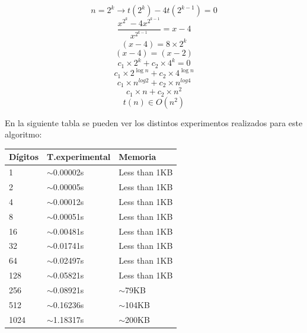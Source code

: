 \documentclass{article}
\begin{document}
$$n = 2^k \rightarrow t(2^k)-4t (2^{k-1})=0$$
$$\frac{x^{2^k}-4x^{2^{k-1}}}{x^{2^{k-1}}} = x-4 $$
$$ (x-4)=8 \times 2^k $$
$$ (x-4)=(x-2) $$
$$ c_1\times 2^k+c_2 \times 4^k=0 $$
$$ c_1 \times 2^{\log n}+c_2 \times 4^{\log n} $$
$$ c_1 \times n^{log 2}+c_2 \times n^{log 4} $$
$$ c_1 \times n+c_2 \times n^2 $$
$$ t(n)\in O(n^2) $$

\begin{center}
En la siguiente tabla se pueden ver los distintos experimentos realizados para este algoritmo: 
\end{center}
\label{dyv-table}
\begin{adjustbox}{width=0.5\textwidth,center=\textwidth}
\begin{tabular}{|l|l|l|}
\hline
{Dígitos} 					   & {T.experimental} 					   	& {Memoria} 					 \\ \hline
1                              & $\sim$0.00002s                         & Less than 1KB                  \\ \hline
2                              & $\sim$0.00005s                        	& Less than 1KB                  \\ \hline
4                              & $\sim$0.00012s                        	& Less than 1KB                  \\ \hline
8                              & $\sim$0.00051s                        	& Less than 1KB                  \\ \hline
16                             & $\sim$0.00481s                        	& Less than 1KB                  \\ \hline
32                             & $\sim$0.01741s                       	& Less than 1KB                  \\ \hline
64                             & $\sim$0.02497s                        	& Less than 1KB                  \\ \hline
128                            & $\sim$0.05821s                        	& Less than 1KB                  \\ \hline
256                            & $\sim$0.08921s                       	& $\sim$79KB                     \\ \hline
512                            & $\sim$0.16236s                       	& $\sim$104KB                    \\ \hline
1024                           & $\sim$1.18317s                        	& $\sim$200KB                    \\ \hline
\end{tabular}
\end{adjustbox}
\end{document}

